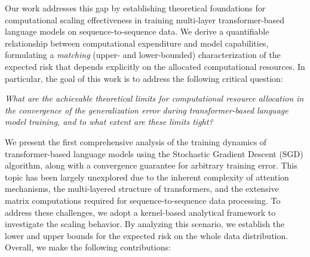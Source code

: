 \documentclass[11pt]{article}
\theoremstyle{plain}
\begin{document}
Our work addresses this gap by establishing theoretical foundations for computational scaling effectiveness in training multi-layer transformer-based language models on sequence-to-sequence data. We derive a quantifiable relationship between computational expenditure and model capabilities, formulating a {\it matching} (upper- and lower-bounded) characterization of the expected risk that depends explicitly on the allocated computational resources. In particular, the goal of this work is to address the following critical question:
\begin{center}
    {\it What are the achievable theoretical limits for computational resource allocation in the convergence of the generalization error during transformer-based language model training, and to what extent are these limits tight?}
\end{center}
We present the first comprehensive analysis of the training dynamics of transformer-based language models using the Stochastic Gradient Descent (SGD) algorithm, along with a convergence guarantee for arbitrary training error. This topic has been largely unexplored due to the inherent complexity of attention mechanisms, the multi-layered structure of transformers, and the extensive matrix computations required for sequence-to-sequence data processing. To address these challenges, we adopt a kernel-based analytical framework to investigate the scaling behavior. By analyzing this scenario, we establish the lower and upper bounds for the expected risk on the whole data distribution. Overall, we make the following contributions:
\end{document}

